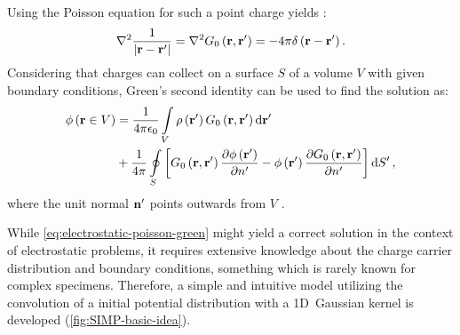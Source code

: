 Using the Poisson equation for such a point charge yields \cite{Jackson1999}:
\begin{equation}
  \laplacian \frac{1}{\lvert \vb{r} - \vb{r'}\rvert} = \laplacian G_0\left(\vb{r}, \vb{r'}\right) = -4\pi \delta\left(\vb{r} - \vb{r'}\right).
\end{equation}
Considering that charges can collect on a surface $S$ of a volume $V$ with given boundary conditions, Green's second identity can be used to find the solution as:
\begin{align}
  \label{eq:electrostatic-poisson-green}
  \phi \left(\vb{r} \in V \right) & = \frac{1}{4\pi \epsilon_0} \int \limits_V \rho\left(\vb{r'}\right) G_0\left(\vb{r}, \vb{r'}\right) \dd{\vb{r'}} \notag \\
  &+ \frac{1}{4\pi} \oint \limits_S \left[ G_0\left(\vb{r}, \vb{r'}\right) \pdv{\phi \left(\vb{r'}\right)}{n'} - \phi \left(\vb{r'}\right) \pdv{G_0\left(\vb{r}, \vb{r'}\right)}{n'} \right] \dd{S'},
\end{align}
where the unit normal $\vb{n'}$ points outwards from $V$ \cite{Jackson1999}.

While \cref{eq:electrostatic-poisson-green} might yield a correct solution in the context of electrostatic problems, it requires extensive knowledge about the charge carrier distribution and boundary conditions, something which is rarely known for complex specimens. Therefore, a simple and intuitive model utilizing the convolution of a initial potential distribution with a 1D~Gaussian kernel is developed (\cref{fig:SIMP-basic-idea}).
